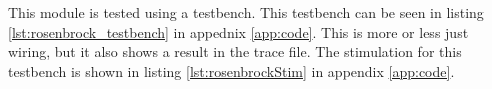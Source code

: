 This module is tested using a testbench. This testbench can be seen in listing \ref{lst:rosenbrock_testbench} in appednix \ref{app:code}. This is more or less just wiring, but it also shows a result in the trace file. The stimulation for this testbench is shown in listing \ref{lst:rosenbrockStim} in appendix \ref{app:code}.




